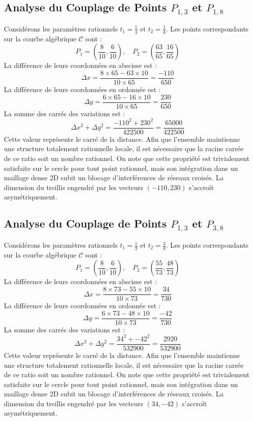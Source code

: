 \documentclass[12pt, a4paper]{article}
\begin{document}
\subsection{Analyse du Couplage de Points $P_{1,3}$ et $P_{1,8}$}
Considérons les paramètres rationnels $t_1 = \frac{1}{3}$ et $t_2 = \frac{1}{8}$.
Les points correspondants sur la courbe algébrique $\mathcal{C}$ sont :
$$ P_1 = \left( \frac{8}{10}, \frac{6}{10} \right), \quad P_2 = \left( \frac{63}{65}, \frac{16}{65} \right) $$
La différence de leurs coordonnées en abscisse est :
$$ \Delta x = \frac{8 \times 65 - 63 \times 10}{10 \times 65} = \frac{-110}{650} $$
La différence de leurs coordonnées en ordonnée est :
$$ \Delta y = \frac{6 \times 65 - 16 \times 10}{10 \times 65} = \frac{230}{650} $$
La somme des carrés des variations est :
$$ \Delta x^2 + \Delta y^2 = \frac{ -110^2 + 230^2 }{ 422500 } = \frac{ 65000 }{ 422500 } $$
Cette valeur représente le carré de la distance. Afin que l'ensemble maintienne une structure totalement rationnelle locale, il est nécessaire que la racine carrée de ce ratio soit un nombre rationnel. On note que cette propriété est trivialement satisfaite sur le cercle pour tout point rationnel, mais son intégration dans un maillage dense 2D subit un blocage d'interférences de réseaux croisés. La dimension du treillis engendré par les vecteurs $( -110, 230 )$ s'accroît asymétriquement.


\subsection{Analyse du Couplage de Points $P_{1,3}$ et $P_{3,8}$}
Considérons les paramètres rationnels $t_1 = \frac{1}{3}$ et $t_2 = \frac{3}{8}$.
Les points correspondants sur la courbe algébrique $\mathcal{C}$ sont :
$$ P_1 = \left( \frac{8}{10}, \frac{6}{10} \right), \quad P_2 = \left( \frac{55}{73}, \frac{48}{73} \right) $$
La différence de leurs coordonnées en abscisse est :
$$ \Delta x = \frac{8 \times 73 - 55 \times 10}{10 \times 73} = \frac{34}{730} $$
La différence de leurs coordonnées en ordonnée est :
$$ \Delta y = \frac{6 \times 73 - 48 \times 10}{10 \times 73} = \frac{-42}{730} $$
La somme des carrés des variations est :
$$ \Delta x^2 + \Delta y^2 = \frac{ 34^2 + -42^2 }{ 532900 } = \frac{ 2920 }{ 532900 } $$
Cette valeur représente le carré de la distance. Afin que l'ensemble maintienne une structure totalement rationnelle locale, il est nécessaire que la racine carrée de ce ratio soit un nombre rationnel. On note que cette propriété est trivialement satisfaite sur le cercle pour tout point rationnel, mais son intégration dans un maillage dense 2D subit un blocage d'interférences de réseaux croisés. La dimension du treillis engendré par les vecteurs $( 34, -42 )$ s'accroît asymétriquement.
\end{document}
